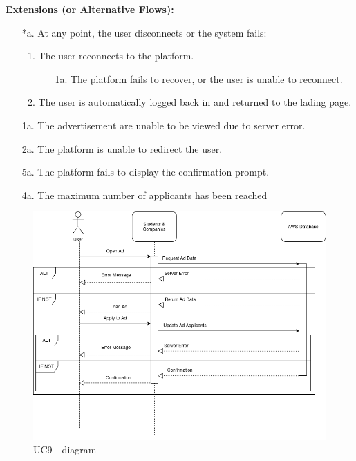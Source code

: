 \begin{itemize}[label={[\textbf{UC}]}, align=left, leftmargin=*]
    \textbf{Extensions (or Alternative Flows):} 
    \begin{enumerate}[label=\arabic*.]
        \item[*a.] At any point, the user disconnects or the system fails:
            \begin{enumerate}[label=\arabic*.]
                \item The user reconnects to the platform.
                    \begin{enumerate}[label=\alph*.]
                        \item[1a.] The platform fails to recover, or the user is unable to reconnect.
                    \end{enumerate}
                 \item The user is automatically logged back in and returned to the lading page.
            \end{enumerate}
        \item[1a.] The advertisement are unable to be viewed due to server error. 
        \item[2a.] The platform is unable to redirect the user.
        \item[5a.] The platform fails to display the confirmation prompt.
        \item[4a.] The maximum number of applicants has been reached
        \end{enumerate}

        
     \begin{figure}[H]
    	\includegraphics[width=\textwidth,height=\textheight,keepaspectratio]{RASD-Latex/assets/Use Case Diagrams/UC9.png}
    	\caption{UC9 - diagram}
    	\label{fig:DataRequest}
    \end{figure}
     

\end{itemize}

